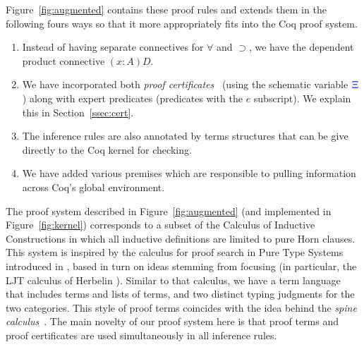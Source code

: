 Figure~\ref{fig:augmented} contains these proof rules and extends them
in the following fours ways so that it more appropriately fits into
the Coq proof system.
\begin{enumerate}
  \item Instead of having separate connectives for $\forall$ and
    $\supset$, we have the dependent product connective $(x:A)D$. 
  \item We have incorporated both \emph{proof certificates}~\cite{chihani17jar} (using the
    schematic variable ${\color{blue}{\Xi}}$) along with expert predicates
    (predicates with the $e$ subscript). We explain this in Section~\ref{ssec:cert}.
  \item The inference rules are also annotated by terms structures that
    can be give directly to the Coq kernel for checking.
  \item We have added various premises which are responsible to
    pulling information across  Coq's global environment.
\end{enumerate}
The proof system described in Figure~\ref{fig:augmented} (and
implemented in Figure~\ref{fig:kernel}) corresponds to a subset of the Calculus
of Inductive Constructions in which all inductive definitions are
limited to pure Horn clauses.
%
This  system is inspired by the calculus for proof search in
Pure Type Systems introduced in \cite{LengrandDM06}, based in turn on
ideas stemming from focusing (in particular, the LJT calculus of
Herbelin \cite{Herbelin94}). Similar to that calculus, we have a
term language that includes terms and lists of terms, and two distinct
typing judgments for the two categories.
%
This style of  proof terms coincides with the idea behind the \emph{spine
  calculus}~\cite{Cervesato97tr}.  The main novelty of our proof
system here is that proof terms and proof certificates are used
simultaneously in all inference rules.

